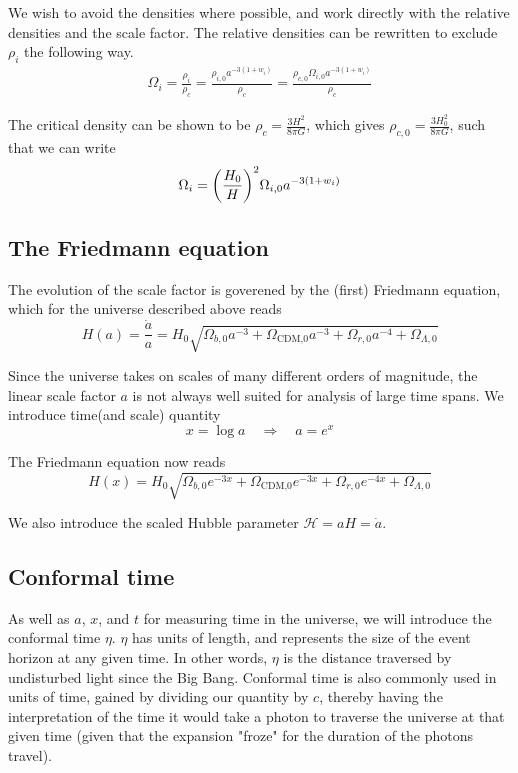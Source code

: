 \documentclass[10pt, a4paper]{article}
\renewcommand{\exp}{e^}
\renewcommand{\exp}{e^}
\begin{document}
We wish to avoid the densities where possible, and work directly with the relative densities and the scale factor. The relative densities can be rewritten to exclude $\rho_i$ the following way.
\begin{align*}
    \Omega_{i} = \frac{\rho_i}{\rho_c} = \frac{\rho_{i,0}a^{-3(1+w_i)}}{\rho_c} = \frac{\rho_{c,0}\Omega_{i,0}a^{-3(1+w_i)}}{\rho_c}
\end{align*}

The critical density can be shown \cite{callin2006} to be $\rho_c = \frac{3H^2}{8\pi G}$, which gives $\rho_{c,0} = \frac{3H_0^2}{8\pi G}$, such that we can write
\begin{align}\label{eqn:Omegas}
    \Omega_{i} = \qty(\frac{H_0}{H})^2\Omega_{i,0}a^{-3(1+w_i)}
\end{align}


\subsection{The Friedmann equation}
The evolution of the scale factor is goverened by the (first) Friedmann equation, which for the universe described above reads \cite{callin2006}
\begin{equation}
    H(a) = \frac{\dot{a}}{a} = H_0\sqrt{\Omega_{b,0} a^{-3} + \Omega_\text{{CDM},0}a^{-3} + \Omega_{r,0}a^{-4} + \Omega_{\Lambda,0}}
\end{equation}

Since the universe takes on scales of many different orders of magnitude, the linear scale factor $a$ is not always well suited for analysis of large time spans. We introduce time(and scale) quantity
\begin{equation}
    x = \log{a} \quad \Rightarrow \quad a = \exp{x}
\end{equation}

The Friedmann equation now reads
\begin{equation} \label{eqn:Friedmann}
    H(x) = H_0\sqrt{\Omega_{b,0} e^{-3x} + \Omega_\text{{CDM},0}e^{-3x} + \Omega_{r,0}e^{-4x} + \Omega_{\Lambda,0}}
\end{equation}

We also introduce the scaled Hubble parameter $\mathcal{H} = aH = \dot{a}$.


\subsection{Conformal time}
As well as $a$, $x$, and $t$ for measuring time in the universe, we will introduce the conformal time $\eta$. $\eta$ has units of length, and represents the size of the event horizon at any given time. In other words, $\eta$ is the distance traversed by undisturbed light since the Big Bang. Conformal time is also commonly used in units of time, gained by dividing our quantity by $c$, thereby having the interpretation of the time it would take a photon to traverse the universe at that given time (given that the expansion "froze" for the duration of the photons travel).
\end{document}
